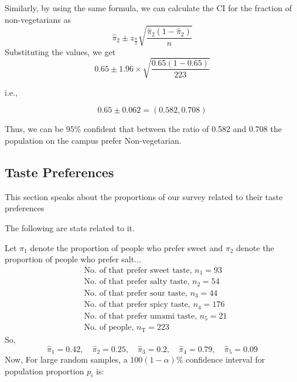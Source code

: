 \documentclass[12pt]{article}
\begin{document}
    Similarly, by using the same formula, we can calculate the CI for the fraction of non-vegetarians as
    \begin{equation}
    \hat{\pi}_2 \pm z_{\frac{\alpha}{2}} \sqrt{\frac{\hat{\pi}_2(1 - \hat{\pi}_2)}{n}}
    \end{equation}
    Substituting the values, we get
    \begin{equation}
    0.65 \pm 1.96 \times \sqrt{\frac{0.65(1 - 0.65)}{223}}
    \end{equation}
    
    i.e.,

    \[
    0.65 \pm 0.062 = (0.582, 0.708)
    \]

    
    Thus, we can be 95\% confident that between the ratio of 0.582 and 0.708 the population on the campus prefer Non-vegetarian.


\subsection{Taste Preferences}


 This section speaks about the proportions of our survey related to their taste preferences
    
    The following are stats related to it.
    
    Let $\pi_1$ denote the proportion of people who prefer sweet and $\pi_2$ denote the proportion of people who prefer salt...
    \begin{align}
        &\text{No. of that prefer sweet taste, } n_{\text{1}} = 93 \\
        &\text{No. of that prefer salty taste, } n_{\text{2}} = 54 \\
        &\text{No. of that prefer sour taste, } n_{\text{3}} = 44\\
        &\text{No. of that prefer spicy taste, } n_{\text{4}} = 176 \\
        &\text{No. of that prefer umami taste, } n_{\text{5}} = 21\\
        &\text{No. of people, } n_{\text{T}} = 223
    \end{align}
    So,
    \begin{equation}
        \hat{\pi}_1  = 0.42, \quad \hat{\pi}_2  = 0.25, \quad \hat{\pi}_3  = 0.2, \quad \hat{\pi}_4  = 0.79, \quad \hat{\pi}_5  = 0.09
    \end{equation}
  Now,
  For large random samples, a $100(1 - \alpha)\%$ confidence interval for population proportion $p_i$ is:
\end{document}

